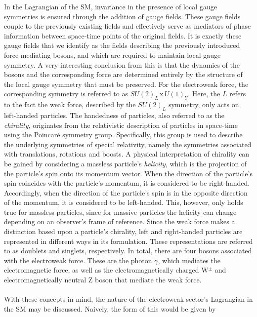 In the Lagrangian of the SM, invariance in the presence of local gauge symmetries is ensured through the addition of gauge fields. These gauge fields couple to the previously existing fields and effectively serve as mediators of phase information between space-time points of the original fields. It is exactly these gauge fields that we identify as the fields describing the previously introduced force-mediating bosons, and which are required to maintain local gauge symmetry. A very interesting conclusion from this is that the dynamics of the bosons and the corresponding force are determined entirely by the structure of the local gauge symmetry that must be preserved. For the electroweak force, the corresponding symmetry is referred to as $SU(2)_{L} \, \mathrm{x} \, U(1)_{\mathit{Y}}$.  Here, the $L$ refers to the fact the weak force, described by the $SU(2)_{L}$ symmetry, only acts on left-handed particles. The handedness of particles, also referred to as the \textit{chirality}, originates from the relativistic description of particles in space-time using the Poincar\'{e} symmetry group. Specifically, this group is used to describe the underlying symmetries of special relativity, namely the symmetries associated with translations, rotations and boosts. A physical interpretation of chirality  can be gained by considering a massless particle's \textit{helicity}, which is the projection of the particle's spin onto its momentum vector. When the direction of the particle's spin coincides with the particle's momentum, it is considered to be right-handed. Accordingly, when the direction of the particle's spin is in the opposite direction of the momentum, it is considered to be left-handed. This, however, only holds true for massless particles, since for massive particles the helicity can change depending on an observer's frame of reference. Since the weak force makes a distinction based upon a particle's chirality, left and right-handed particles are represented in different ways in its formulation. These representations are referred to as doublets and singlets, respectively. In total, there are four bosons associated with the electroweak force. These are the photon $\gamma$, which mediates the electromagnetic force, as well as the electromagnetically charged W$^{\pm}$ and electromagnetically neutral Z boson that mediate the weak force. \\
\\
With these concepts in mind, the nature of the electroweak sector's Lagrangian in the SM may be discussed. Naively, the form of this would be given by

